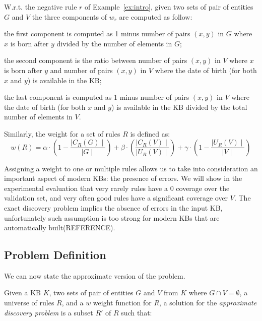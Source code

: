 \begin{myExample}
	W.r.t. the negative rule $r$ of Example~\ref{ex:intro}, given two sets of pair of entities $G$ and $V$ the three components of $w_r$ are computed as follow:
	\begin{inparaenum}[\itshape(i)]
		\item the first component is computed as 1 minus number of pairs $(x,y)$ in $G$ where
		$x$ is born after $y$ divided by the number of elements in $G$;
		\item the second component is the ratio between number of pairs $(x,y)$ in $V$ where $x$ is born after $y$ and number of pairs $(x,y)$ in $V$ where the date of birth (for both $x$ and $y$) is available in the KB;
		\item the last component is computed as 1 minus number of pairs $(x,y)$ in $V$ where the date of birth (for both $x$ and $y$) is available in the KB divided by the total number of elements in $V$.
	\end{inparaenum}
\end{myExample}
	

Similarly, the weight for a set of rules $R$ is defined as:
\begin{equation*}
w(R) = \alpha \cdot (1-\frac{\mid C_{R}(G)\mid}{\mid G \mid}) +\beta \cdot (\frac{\mid C_{R}(V) \mid}{\mid U_{R}(V)\mid})  +\gamma \cdot (1-\frac{\mid U_{R}(V)\mid}{\mid V \mid})
\end{equation*}

Assigning a weight to one or multiple rules allows us to take into consideration an important aspect of modern KBs: the presence of errors. We will show in the experimental evaluation that very rarely rules have a $0$ coverage over the validation set, and very often good rules have a significant coverage over $V$. The exact discovery problem implies the absence of errors in the input KB, unfortunately such assumption is too strong for modern KBs that are automatically built(REFERENCE).

\subsection{Problem Definition}
We can now state the approximate version of the problem.


Given a KB $K$, two sets of pair of entities $G$ and $V$ from $K$ where $G \cap V = \emptyset$, a universe of rules $R$, and a $w$ weight function for $R$,
a solution for the \emph{approximate discovery problem} is a subset $R'$ of $R$  such that:

